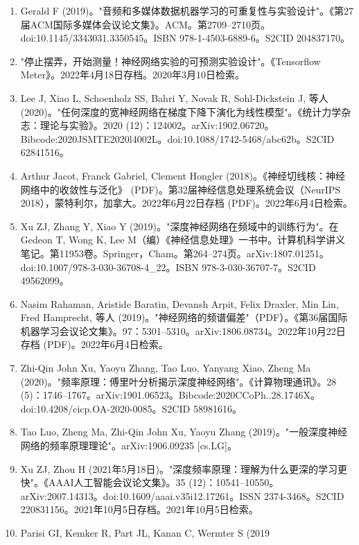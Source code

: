 \begin{enumerate}
\item Gerald F (2019)。"音频和多媒体数据机器学习的可重复性与实验设计"。《第27届ACM国际多媒体会议论文集》。ACM。第2709–2710页。doi:10.1145/3343031.3350545。ISBN 978-1-4503-6889-6。S2CID 204837170。
\item "停止摆弄，开始测量！神经网络实验的可预测实验设计"。《Tensorflow Meter》。2022年4月18日存档。2020年3月10日检索。
\item Lee J, Xiao L, Schoenholz SS, Bahri Y, Novak R, Sohl-Dickstein J, 等人 (2020)。"任何深度的宽神经网络在梯度下降下演化为线性模型"。《统计力学杂志：理论与实验》。2020 (12)：124002。arXiv:1902.06720。Bibcode:2020JSMTE2020l4002L。doi:10.1088/1742-5468/abc62b。S2CID 62841516。
\item Arthur Jacot, Franck Gabriel, Clement Hongler (2018)。《神经切线核：神经网络中的收敛性与泛化》 (PDF)。第32届神经信息处理系统会议（NeurIPS 2018），蒙特利尔，加拿大。2022年6月22日存档 (PDF)。2022年6月4日检索。
\item Xu ZJ, Zhang Y, Xiao Y (2019)。"深度神经网络在频域中的训练行为"。在Gedeon T, Wong K, Lee M（编）《神经信息处理》一书中。计算机科学讲义笔记。第11953卷。Springer，Cham。第264–274页。arXiv:1807.01251。doi:10.1007/978-3-030-36708-4_22。ISBN 978-3-030-36707-7。S2CID 49562099。
\item Nasim Rahaman, Aristide Baratin, Devansh Arpit, Felix Draxler, Min Lin, Fred Hamprecht, 等人 (2019)。"神经网络的频谱偏差"（PDF）。《第36届国际机器学习会议论文集》。97：5301–5310。arXiv:1806.08734。2022年10月22日存档 (PDF)。2022年6月4日检索。
\item Zhi-Qin John Xu, Yaoyu Zhang, Tao Luo, Yanyang Xiao, Zheng Ma (2020)。"频率原理：傅里叶分析揭示深度神经网络"。《计算物理通讯》。28 (5)：1746–1767。arXiv:1901.06523。Bibcode:2020CCoPh..28.1746X。doi:10.4208/cicp.OA-2020-0085。S2CID 58981616。
\item Tao Luo, Zheng Ma, Zhi-Qin John Xu, Yaoyu Zhang (2019)。"一般深度神经网络的频率原理理论"。arXiv:1906.09235 [cs.LG]。
\item Xu ZJ, Zhou H (2021年5月18日)。"深度频率原理：理解为什么更深的学习更快"。《AAAI人工智能会议论文集》。35 (12)：10541–10550。arXiv:2007.14313。doi:10.1609/aaai.v35i12.17261。ISSN 2374-3468。S2CID 220831156。2021年10月5日存档。2021年10月5日检索。
\item Parisi GI, Kemker R, Part JL, Kanan C, Wermter S (2019
\end{enumerate}